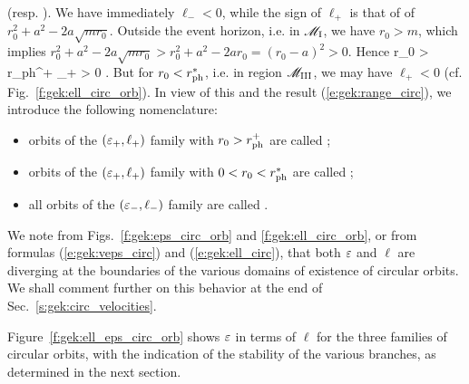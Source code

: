 (resp. ).
We have immediately $\ell_- < 0$, while the sign of $\ell_+$ is that of
of $r_0^2 + a^2 - 2 a \sqrt{mr_0}$.
Outside the event horizon, i.e. in $\mathscr{M}_{\rm I}$, we have $r_0 > m$, which
implies $r_0^2 + a^2 - 2 a \sqrt{mr_0} > r_0^2 + a^2 - 2 a r_0 = (r_0 - a)^2 > 0$. Hence
\be
    r_0 > r_{\rm ph}^+ \quad\Longrightarrow\quad \ell_+ > 0 .
\ee
But for $r_0 < r_{\rm ph}^*$, i.e. in region $\mathscr{M}_{\rm III}$, we may have $\ell_+ < 0$
(cf. Fig.~\ref{f:gek:ell_circ_orb}).
In view of this and the result (\ref{e:gek:range_circ}), we introduce the following nomenclature:
\begin{itemize}
\item orbits of the $(\varepsilon_+,\ell_+)$ family with $r_0 >  r_{\rm ph}^+$
are called ;
\item orbits of the $(\varepsilon_+,\ell_+)$ family with $0 < r_0 < r_{\rm ph}^*$
are called ;
\item all orbits of the $(\varepsilon_-,\ell_-)$ family
are called .
\end{itemize}

We note from Figs.~\ref{f:gek:eps_circ_orb} and \ref{f:gek:ell_circ_orb},
or from formulas (\ref{e:gek:veps_circ}) and (\ref{e:gek:ell_circ}),
that both $\varepsilon$ and $\ell$ are diverging at the boundaries of the various domains
of existence of circular orbits. We shall comment further on this behavior at the end of
Sec.~\ref{s:gek:circ_velocities}.

Figure~\ref{f:gek:ell_eps_circ_orb} shows $\varepsilon$ in terms of $\ell$
for the three families of circular orbits, with the indication of
the stability of the various
branches, as determined in the next section.

